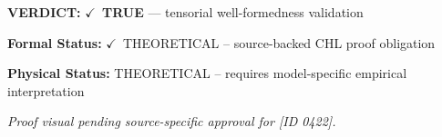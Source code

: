 \textbf{VERDICT:} \ensuremath{\checkmark}\ \textbf{TRUE} --- tensorial well-formedness validation

\textbf{Formal Status:} \ensuremath{\checkmark}\ THEORETICAL -- source-backed CHL proof obligation

\textbf{Physical Status:} THEORETICAL -- requires model-specific empirical interpretation
\par\vspace{0.45em}
\par
\vfill
\begingroup\footnotesize\itshape
Proof visual pending source-specific approval for [ID 0422].
\par\endgroup
\vfill
\endgroup
\endgroup
